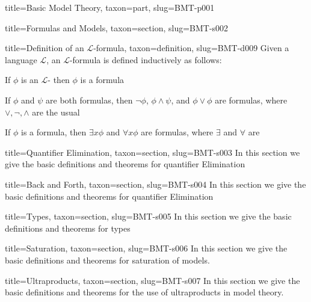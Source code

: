 \documentclass[a4paper]{article}
\begin{document}
\begin{tree}{title={Basic Model Theory}, taxon={part}, slug={BMT-p001}}
\begin{tree}{title={Formulas and Models}, taxon={section}, slug={BMT-s002}}
\begin{tree}{title={Definition of an \(\mathcal {L}\)-formula}, taxon={definition}, slug={BMT-d009}}
Given a language \(\mathcal {L}\), an \(\mathcal {L}\)-formula is defined inductively as follows:\par{If \(\phi\) is an \(\mathcal {L}\)- then \(\phi\) is a formula}\par{If \(\phi\) and \(\psi\) are both formulas, then \(\neg \phi\), \(\phi   \land   \psi\), and \(\phi \lor \phi\) are formulas, where \(\lor , \neg , \land\) are the usual }\par{If \(\phi\) is a formula, then \(\exists  x  \phi\) and \(\forall  x  \phi\) are formulas, where \(\exists\) and \(\forall\) are }
\end{tree}

\end{tree}


  
  
\begin{tree}{title={Quantifier Elimination}, taxon={section}, slug={BMT-s003}}
In this section we give the basic definitions and theorems for quantifier Elimination
\end{tree}


  
  
\begin{tree}{title={Back and Forth}, taxon={section}, slug={BMT-s004}}
In this section we give the basic definitions and theorems for quantifier Elimination
\end{tree}


  
  
\begin{tree}{title={Types}, taxon={section}, slug={BMT-s005}}
In this section we give the basic definitions and theorems for types
\end{tree}


  
  
\begin{tree}{title={Saturation}, taxon={section}, slug={BMT-s006}}
In this section we give the basic definitions and theorems for saturation of models.
\end{tree}


  
  
\begin{tree}{title={Ultraproducts}, taxon={section}, slug={BMT-s007}}
In this section we give the basic definitions and theorems for the use of ultraproducts in model theory.
\end{tree}


\end{tree}
\end{document}
